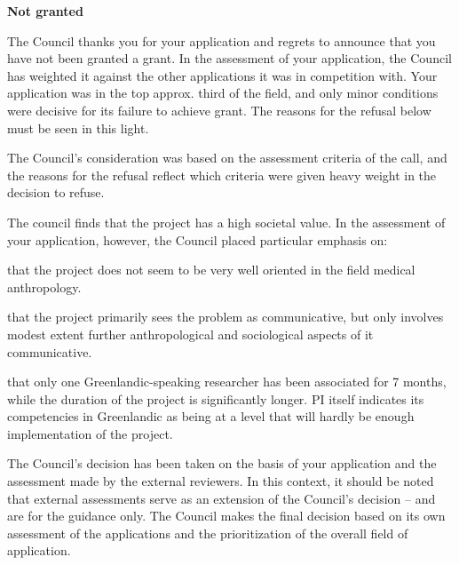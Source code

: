 \documentclass[twocolumn, serif, rga, authordate]{jote-article}
\begin{document}
\textbf{Not granted}


The Council thanks you for your application and regrets to announce that you have not been granted a grant. In the assessment of your application, the Council has weighted it against the other applications it was in competition with. Your application was in the top approx.
third of the field, and only minor conditions were decisive for its failure to achieve grant. The reasons for the refusal below must be seen in this light.

The Council's consideration was based on the assessment criteria of the call, and the reasons for the refusal reflect which criteria were given heavy weight in the decision to refuse.

The council finds that the project has a high societal value. In the assessment of your application, however, the Council placed particular emphasis on:

that the project does not seem to be very well oriented in the field medical anthropology.

that the project primarily sees the problem as communicative, but only involves modest extent further anthropological and sociological aspects of it communicative.

that only one Greenlandic-speaking researcher has been associated for 7 months, while the duration of the project is significantly longer. PI itself indicates its competencies in Greenlandic as being at a level that will hardly be enough implementation of the project.

The Council's decision has been taken on the basis of your application and the assessment made by the external reviewers. In this context, it should be noted that external assessments serve as an extension of the Council's decision -- and are for the guidance only. The Council makes the final decision based on its own assessment of the applications and the prioritization of the overall field of application.


\nocite{*}

\printbibliography
\license
\end{document}
